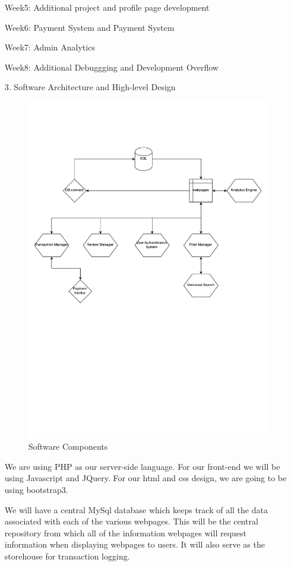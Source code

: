 \documentclass[12pt]{article}
\begin{document}
\begin{enumerate}
Week5: Additional project and profile page development

Week6: Payment System and Payment System

Week7: Admin Analytics

Week8: Additional Debuggging and Development Overflow

\item[3.] Software Architecture and High-level Design
\begin{figure}[ht!]
\centering
\includegraphics[width=150mm]{swag.pdf}
\caption{Software Components \label{overflow}}
\end{figure}

We are using PHP as our server-side language. For our front-end we will be using Javascript and JQuery. For our html and css design, we are going to be using bootstrap3.

We will have a central MySql database which keeps track of all the data associated with each of the various webpages. This will be the central repository from which all of the information webpages will request information when displaying webpages to users. It will also serve as the storehouse for transaction logging.


\end{enumerate}
\end{document}

